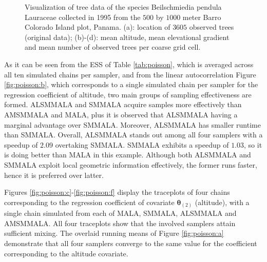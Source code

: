 \documentclass[twoside,11pt]{article}
\begin{document}
\begin{figure}
	\caption{Visualization of tree data of the species Beilschmiedia pendula Lauraceae collected in 1995 from the $500$ by 
	$1000$ meter Barro Colorado Island plot, Panama. (a): location of $3605$ observed trees (original data); (b)-(d): mean 
	altitude, mean elevational gradient and mean number of observed trees per coarse grid cell.}
	\label{fig:poisson_data}
\end{figure}

As it can be seen from the ESS of Table \ref{tab:poisson}, which is averaged across all ten simulated chains per sampler, 
and from the linear autocorrelation Figure \ref{fig:poisson:b}, which corresponds to a single simulated chain per sampler 
for the regression coefficient of altitude, two main groups of sampling effectiveness are formed. ALSMMALA and SMMALA 
acquire samples more effectively than AMSMMALA and MALA, plus it is observed that ALSMMALA having a marginal advantage over 
SMMALA. Moreover, ALSMMALA has smaller runtime than SMMALA. Overall, ALSMMALA stands out among all four samplers with a 
speedup of $2.09$ overtaking SMMALA. SMMALA exhibits a speedup of $1.03$, so it is doing better than MALA in this example. 
Although both ALSMMALA and SMMALA exploit local geometric information effectively, the former runs faster, hence it is 
preferred over latter. 

Figures \ref{fig:poisson:c}-\ref{fig:poisson:f} display the traceplots of four chains corresponding to the regression 
coefficient of covariate $\boldsymbol{\theta}_{(2)}$ (altitude), with a single chain simulated from each of MALA, SMMALA,
ALSMMALA and AMSMMALA. All four traceplots show that the involved samplers attain sufficient mixing. The overlaid running 
means of Figure \ref{fig:poisson:a} demonstrate that all four samplers converge to the same value for the coefficient 
corresponding to the altitude covariate.
\end{document}

